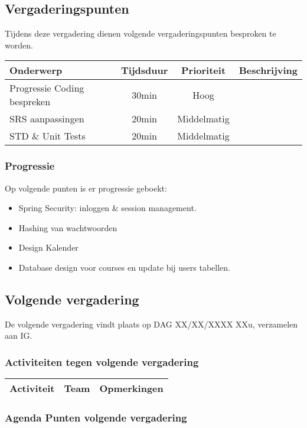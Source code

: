 \subsection{Vergaderingspunten}
Tijdens deze vergadering dienen volgende vergaderingspunten besproken te worden.
\begin{table} [H]
	\centering
	\begin{tabular} {l|c|c|c}
		Onderwerp & Tijdsduur & Prioriteit & Beschrijving \\ %
		\hline
		Progressie Coding bespreken & 30min & Hoog & \\
		SRS aanpassingen & 20min & Middelmatig & \\
		STD \& Unit Tests & 20min & Middelmatig & \\
	\end{tabular}
\end{table}
\subsubsection{Progressie}
Op volgende punten is er progressie geboekt:
\begin{itemize}
	\item Spring Security: inloggen \& session management.
	\item Hashing van wachtwoorden
	\item Design Kalender
	\item Database design voor courses en update bij users tabellen.
\end{itemize}

\subsection{Volgende vergadering}
De volgende vergadering vindt plaats op DAG XX/XX/XXXX XXu, verzamelen aan IG.
\subsubsection{Activiteiten tegen volgende vergadering} \label{sec:TODOActiviteiten}
\begin{table} [H]
	\centering
	\begin{tabular} {l|l|l}
		\textbf{Activiteit} & \textbf{Team} & \textbf{Opmerkingen} \\
		\hline

	\end{tabular}
\end{table}

\subsubsection{Agenda Punten volgende vergadering}